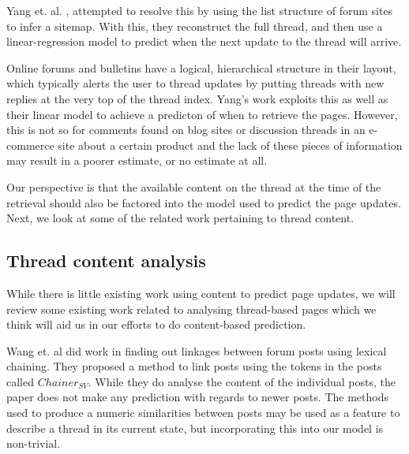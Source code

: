 \documentclass[12 pt]{article}
\begin{document}
Yang et. al. \cite{Yang2009}, attempted to resolve this by using the list structure of forum sites to infer a sitemap. With this, they reconstruct the full thread, and then use a linear-regression model to predict when the next update to the thread will arrive. %

Online forums and bulletins have a logical, hierarchical structure in their layout, which typically alerts the user to thread updates by putting threads with new replies at the very top of the thread index. Yang's work exploits this as well as their linear model to achieve a predicton of when to retrieve the pages.
However, this is not so for comments found on blog sites or discussion threads in an e-commerce site about a certain product and the lack of these pieces of information may result in a poorer estimate, or no estimate at all.


Our perspective is that the available content on the thread at the time of the retrieval should also be factored into the model used to predict the page updates. Next, we look at some of the related work pertaining to thread content.

\subsection{Thread content analysis}
While there is little existing work using content to predict page updates, we will review some existing work related to analysing thread-based pages which we think will aid us in our efforts to do content-based prediction.

Wang et. al \cite{Wang2011} did work in finding out linkages between forum posts using lexical chaining. They proposed a method to link posts using the tokens in the posts called $Chainer_{SV}$. While they do analyse the content of the individual posts, the paper does not make any prediction with regards to newer posts. The methods used to produce a numeric similarities between posts may be used as a feature to describe a thread in its current state, but incorporating this into our model is non-trivial.

\end{document}
